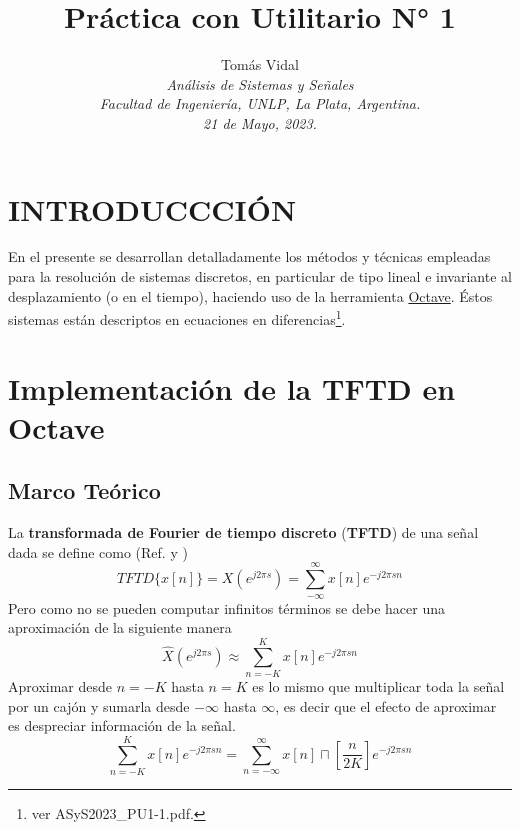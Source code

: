 \documentclass[letterpaper, 10 pt, conference]{ieeeconf}  %
\title{\LARGE \bf Pr\'actica con Utilitario N° 1}
\author{
  Tom\'as Vidal\\
  {\it An\'alisis de Sistemas y Se\~{n}ales}\\
  {\it Facultad de Ingenier\'ia, UNLP, La Plata, Argentina.}\\
  {\it 21 de Mayo, 2023.}
}
\begin{document}
\maketitle
\thispagestyle{empty}
\pagestyle{empty}

\section{INTRODUCCCI\'ON}
En el presente se desarrollan detalladamente los m\'etodos y t\'ecnicas empleadas para la resoluci\'on de sistemas discretos, en particular de tipo lineal e invariante al desplazamiento (o en el tiempo), haciendo uso de la herramienta \href{https://octave.org/}{Octave}. \'Estos sistemas est\'an descriptos en ecuaciones en diferencias\footnote{ver ASyS2023\_PU1-1.pdf.}.

\section{Implementaci\'on de la \textbf{TFTD} en Octave}
\subsection{Marco Te\'orico} \label{subsec:TFTD}
La \textbf{transformada de Fourier de tiempo discreto} (\textbf{TFTD}) de una se\~{n}al dada se define como (Ref. \cite{bib:tftd_tp5} y \cite{bib:tftd_teoria})
\[
  TFTD\{x[n]\} = X(e^{j2{\pi}s}) = \sum_{-\infty}^{\infty}{x[n]e^{-j2{\pi}sn}}
\]
Pero como no se pueden computar infinitos t\'erminos se debe hacer una aproximaci\'on de la siguiente manera
\[
  \hat{X}(e^{j2{\pi}s}) \approx \sum_{n=-K}^{K}{x[n]e^{-j2{\pi}sn}}
\]
Aproximar desde $n=-K$ hasta $n=K$ es lo mismo que multiplicar toda la se\~nal por un caj\'on y sumarla desde $-\infty$ hasta $\infty$, es decir que el efecto de aproximar es despreciar informaci\'on de la se\~nal.
\[
  \sum_{n=-K}^{K}{x[n]e^{-j2{\pi}sn}} = \sum_{n=-\infty}^{\infty}{x[n]\sqcap[\frac{n}{2K}]e^{-j2{\pi}sn}}
\]
\end{document}
